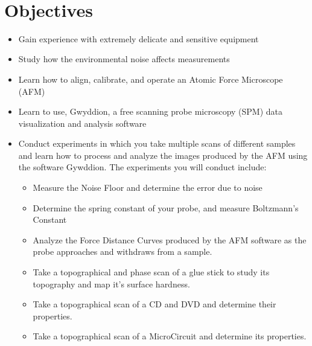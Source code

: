 \documentclass{../lab}
\begin{document}
\textbf{​}

\section{Objectives}

\begin{itemize}
    \item Gain experience with extremely delicate and sensitive equipment

    \item Study how the environmental noise affects measurements

    \item Learn how to align, calibrate, and operate an Atomic Force Microscope (AFM)

    \item Learn to use, Gwyddion, a free scanning probe microscopy (SPM) data visualization and analysis software

    \item Conduct experiments in which you take multiple scans of different samples and learn how to process and analyze the images produced by the AFM using the software Gywddion.  The experiments you will conduct include:

    \begin{itemize}
        \item Measure the Noise Floor and determine the error due to noise

        \item Determine the spring constant of your probe, and measure Boltzmann's Constant

        \item Analyze the Force Distance Curves produced by the AFM software as the probe approaches and withdraws from a sample.

        \item Take a topographical and phase scan of a glue stick to study its topography and map it's surface hardness.

        \item Take a topographical scan of a CD and DVD and determine their properties.

        \item Take a topographical scan of a MicroCircuit and determine its properties.

    \end{itemize}

\end{itemize}
\end{document}

